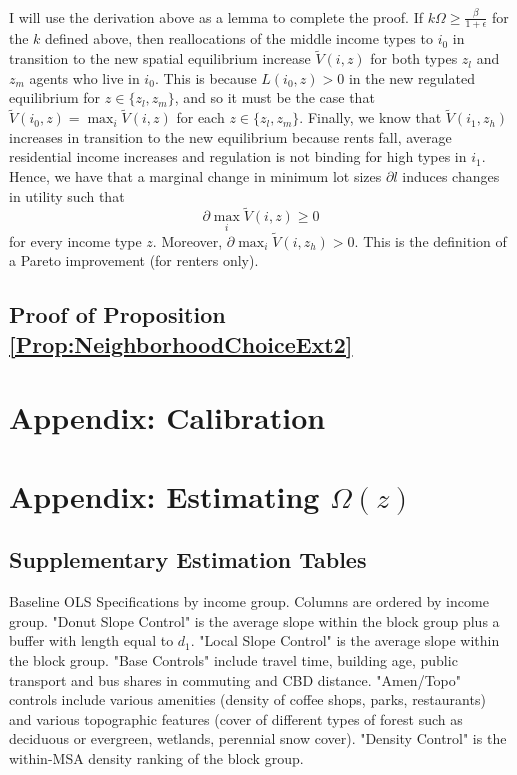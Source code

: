 \documentclass[11pt]{article}
\begin{document}
	\paragraph*{}
	I will use the derivation above as a lemma to complete the proof. If  $k\Omega \geq \frac{\beta}{1 + \epsilon}$ for the $k$ defined above, then reallocations of the middle income types to $i_{0}$ in transition to the new spatial equilibrium increase $\tilde{V}(i, z)$ for both types $z_{l}$ and $z_{m}$ agents who live in $i_{0}$. This is because $L(i_{0}, z) > 0$ in the new regulated equilibrium for $z \in \{z_{l}, z_{m}\}$, and so it must be the case that $\tilde{V}(i_{0}, z) = \max_{i}\tilde{V}(i, z)$ for each $z \in \{z_{l}, z_{m}\}$. Finally, we know that $\tilde{V}(i_{1}, z_{h})$ increases in transition to the new equilibrium because rents fall, average residential income increases and regulation is not binding for high types in $i_{1}$. Hence, we have that a marginal change in minimum lot sizes $\partial l$ induces changes in utility such that $$\partial \max_{i}\tilde{V}(i, z) \geq 0$$ for every income type $z$. Moreover, $\partial \max_{i}\tilde{V}(i, z_{h}) > 0$. This is the definition of a Pareto improvement (for renters only). 
	
	
	\subsection{Proof of Proposition \ref{Prop:NeighborhoodChoiceExt2}}\label{Proof:NeighborhoodChoiceExt2}
	
	\newpage
	
	
	\section{Appendix: Calibration}\label{Appendix:Calibration}
	
	\newpage
	
	\section{Appendix: Estimating $\Omega(z)$}\label{Appendix:Estimation}
	
	\subsection{Supplementary Estimation Tables} \label{Appendix:SupplementEstTables}
	\begin{table}[htbp]
		
		\caption{Baseline OLS Specifications by income group. Columns are ordered by income group. "Donut Slope Control" is the average slope within the block group plus a buffer with length equal to $d_{1}$. "Local Slope Control" is the average slope within the block group. "Base Controls" include travel time, building age, public transport and bus shares in commuting and CBD distance. "Amen/Topo" controls include various amenities (density of coffee shops, parks, restaurants) and various topographic features (cover of different types of forest such as deciduous or evergreen, wetlands, perennial snow cover). "Density Control" is the within-MSA density ranking of the block group.}\label{table:OLS}
	\end{table}
	
\end{document}
